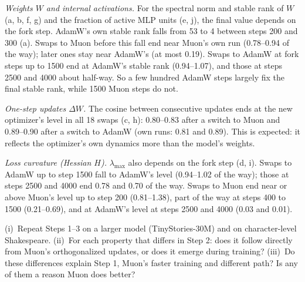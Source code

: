 \documentclass[10pt]{article}
\makeatletter
\renewcommand\paragraph{\@startsection{paragraph}{4}{\z@}{1.0ex \@plus .3ex \@minus .2ex}{-1em}{\normalfont\normalsize\bfseries}}
\makeatother
\begin{document}
\emph{Weights $W$ and internal activations.} For the spectral norm and stable rank of $W$ (a, b, f, g) and the fraction
of active MLP units (e, j), the final value depends on the fork step. AdamW's own stable rank falls from 53 to 4 between
steps 200 and 300 (a). Swaps to Muon before this fall end near Muon's own run (0.78--0.94 of the way); later ones stay
near AdamW's (at most 0.19). Swaps to AdamW at fork steps up to 1500 end at AdamW's stable rank (0.94--1.07), and those
at steps 2500 and 4000 about half-way. So a few hundred AdamW steps largely fix the final stable rank, while 1500 Muon
steps do not.

\emph{One-step updates $\Delta W$.} The cosine between consecutive updates ends at the new optimizer's level in all 18
swaps (c, h): 0.80--0.83 after a switch to Muon and 0.89--0.90 after a switch to AdamW (own runs: 0.81 and 0.89). This
is expected: it reflects the optimizer's own dynamics more than the model's weights.

\emph{Loss curvature (Hessian $H$).} $\lambda_{\max}$ also depends on the fork step (d, i). Swaps to AdamW up to step
1500 fall to AdamW's level (0.94--1.02 of the way); those at steps 2500 and 4000 end 0.78 and 0.70 of the way. Swaps to
Muon end near or above Muon's level up to step 200 (0.81--1.38), part of the way at steps 400 to 1500 (0.21--0.69), and
at AdamW's level at steps 2500 and 4000 (0.03 and 0.01).

\paragraph{Next steps.} (i)~Repeat Steps 1--3 on a larger model (TinyStories-30M) and on character-level Shakespeare.
(ii)~For each property that differs in Step 2: does it follow directly from Muon's orthogonalized updates, or does it
emerge during training? (iii)~Do these differences explain Step 1, Muon's faster training and different path? Is any of
them a reason Muon does better?

\clearpage
\printbibliography

\clearpage \appendix

\end{document}
